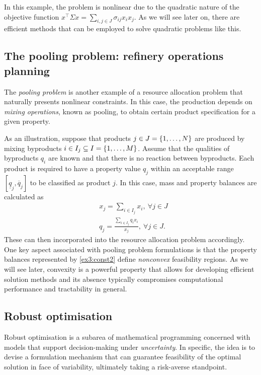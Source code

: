 In this example, the problem is nonlinear due to the quadratic nature of the objective function $x^\top\Sigma x = \sum_{i,j \in J} \sigma_{ij}x_ix_j$. As we will see later on, there are efficient methods that can be employed to solve quadratic problems like this.


\subsection{The pooling problem: refinery operations planning}

The \emph{pooling problem} is another example of a resource allocation problem that naturally presents nonlinear constraints. In this case, the production depends on \emph{mixing operations}, known as pooling, to obtain certain product specification for a given property.

As an illustration, suppose that products $j \in J = \left\{ 1,\dots,N \right \}$ are produced by mixing byproducts $i \in I_j \subseteq I = \left\{ 1,\dots,M \right \}$. Assume that the qualities of byproducts $q_i$ are known and that there is no reaction between byproducts. Each product is required to have a property value $q_j$ within an acceptable range $[\underline{q}_j, \overline{q}_j]$ to be classified as product $j$. In this case, mass and property balances are calculated as
%
\begin{align}
	& x_j  = \sum_{i \in I_j}{x_i}, \ \forall j \in J \\
	& q_j = \frac{\sum_{i \in I_j}q_ix_i}{x_j}, \ \forall j \in J \label{ex3:const2}.
\end{align}
%
These can then incorporated into the resource allocation problem accordingly. One key aspect associated with pooling problem formulations is that the property balances represented by \eqref{ex3:const2} define \emph{nonconvex} feasibility regions. As we will see later, convexity is a powerful property that allows for developing efficient solution methods and its absence typically compromises computational performance and tractability in general.

  
\subsection{Robust optimisation}

Robust optimisation is a subarea of mathematical programming concerned with models that support decision-making under \emph{uncertainty}. In specific, the idea is to devise a formulation mechanism that can guarantee feasibility of the optimal solution in face of variability, ultimately taking a risk-averse standpoint. 

